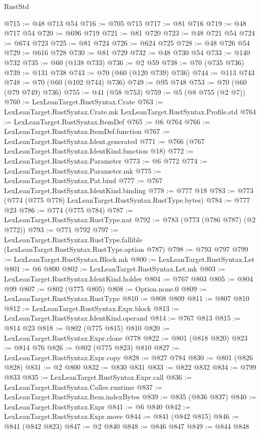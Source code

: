 \begin{lexlean}{RustStd}
\begin{coremodule}
@715 := @48 @713 @54
@716 := @705 @715
@717 := @81 @716
@719 := @48 @717 @54
@720 := @696 @719
@721 := @81 @720
@723 := @48 @721 @54
@724 := @674 @723
@725 := @81 @724
@726 := @624 @725
@728 := @48 @726 @54
@729 := @616 @728
@730 := @81 @729
@732 := @48 @730 @54
@733 := @140 @732
@735 := @60 (@138 @733)
@736 := @2 @59
@738 := @70 (@735 @736)
@739 := @131 @738
@743 := @70 (@60 (@120 @739) @736)
@744 := @113 @743
@748 := @70 (@60 (@102 @744) @736)
@749 := @95 @748
@753 := @70 (@60 (@79 @749) @736)
@755 := @41 (@58 @753)
@759 := @5 (@8 @755 (@2 @7))
@760 := LexLeanTarget.RustSyntax.Crate
@763 := LexLeanTarget.RustSyntax.Crate.mk LexLeanTarget.RustSyntax.Profile.std
@764 := LexLeanTarget.RustSyntax.ItemDef
@765 := @6 @764
@766 := LexLeanTarget.RustSyntax.ItemDef.function
@767 := LexLeanTarget.RustSyntax.Ident.generated
@771 := @766 (@767 LexLeanTarget.RustSyntax.IdentKind.function @18)
@772 := LexLeanTarget.RustSyntax.Parameter
@773 := @6 @772
@774 := LexLeanTarget.RustSyntax.Parameter.mk
@775 := LexLeanTarget.RustSyntax.Pat.bind
@777 := @767 LexLeanTarget.RustSyntax.IdentKind.binding
@778 := @777 @18
@783 := @773 (@774 (@775 @778) LexLeanTarget.RustSyntax.RustType.bytes)
@784 := @777 @23
@786 := @774 (@775 @784)
@787 := LexLeanTarget.RustSyntax.RustType.nat
@792 := @783 (@773 (@786 @787) (@2 @772))
@793 := @771 @792
@797 := LexLeanTarget.RustSyntax.RustType.fallible (LexLeanTarget.RustSyntax.RustType.option @787)
@798 := @793 @797
@799 := LexLeanTarget.RustSyntax.Block.mk
@800 := LexLeanTarget.RustSyntax.Let
@801 := @6 @800
@802 := LexLeanTarget.RustSyntax.Let.mk
@803 := LexLeanTarget.RustSyntax.IdentKind.holder
@804 := @767 @803
@805 := @804 @99
@807 := @802 (@775 @805)
@808 := Option.none.{0}
@809 := LexLeanTarget.RustSyntax.RustType
@810 := @808 @809
@811 := @807 @810
@812 := LexLeanTarget.RustSyntax.Expr.block
@813 := LexLeanTarget.RustSyntax.IdentKind.operand
@814 := @767 @813
@815 := @814 @23
@818 := @802 (@775 @815) @810
@820 := LexLeanTarget.RustSyntax.Expr.clone @778
@822 := @801 (@818 @820)
@823 := @814 @76
@826 := @802 (@775 @823) @810
@827 := LexLeanTarget.RustSyntax.Expr.copy
@828 := @827 @784
@830 := @801 (@826 @828)
@831 := @2 @800
@832 := @830 @831
@833 := @822 @832
@834 := @799 @833
@835 := LexLeanTarget.RustSyntax.Expr.call
@836 := LexLeanTarget.RustSyntax.Callee.runtime
@837 := LexLeanTarget.RustSyntax.Item.indexBytes
@839 := @835 (@836 @837)
@840 := LexLeanTarget.RustSyntax.Expr
@841 := @6 @840
@842 := LexLeanTarget.RustSyntax.Expr.move
@844 := @841 (@842 @815)
@846 := @841 (@842 @823)
@847 := @2 @840
@848 := @846 @847
@849 := @844 @848

\end{coremodule}
\end{lexlean}
